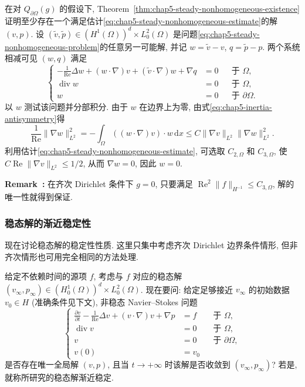\begin{Proof}
在对 $Q_{\partial\Omega}(g)$ 的假设下, Theorem~\ref{thm:chap5-steady-nonhomogeneous-existence}证明至少存在一个满足估计\eqref{eq:chap5-steady-nonhomogeneous-estimate}的解 $(v,p)$. 设 $(\widetilde v,\widetilde p)\in(H^1(\Omega))^d\times L_0^2(\Omega)$ 是问题\eqref{eq:chap5-steady-nonhomogeneous-problem}的任意另一可能解, 并记 $w=\widetilde v-v$, $q=\widetilde p-p$. 两个系统相减可见 $(w,q)$ 满足
\[
 \left\{
 \begin{aligned}
 -\frac1{\operatorname{Re}}\Delta w
 +(w\cdot\nabla)v+(\widetilde v\cdot\nabla)w+\nabla q&=0&&\text{于 }\Omega,\\
 \operatorname{div}w&=0&&\text{于 }\Omega,\\
 w&=0&&\text{于 }\partial\Omega.
 \end{aligned}
 \right.
\]
以 $w$ 测试该问题并分部积分. 由于 $w$ 在边界上为零, 由式\eqref{eq:chap5-inertia-antisymmetry}得
\[
 \frac1{\operatorname{Re}}\|\nabla w\|_{L^2}^2
 =-\int_\Omega((w\cdot\nabla)v)\cdot w\,\mathrm dx
 \leq C\|\nabla v\|_{L^2}\|\nabla w\|_{L^2}^2.
\]
利用估计\eqref{eq:chap5-steady-nonhomogeneous-estimate}, 可选取 $C_{2,\Omega}$ 和 $C_{3,\Omega}$, 使 $C\operatorname{Re}\|\nabla v\|_{L^2}\leq1/2$, 从而 $\nabla w=0$, 因此 $w=0$.
\end{Proof}

\par\noindent{}\textbf{Remark~\thechapterfivesectionthreeremark:}\label{rem:chap5-steady-homogeneous-uniqueness}
在齐次 Dirichlet 条件下 $g=0$, 只要满足 $\operatorname{Re}^2\|f\|_{H^{-1}}\leq C_{3,\Omega}$, 解的唯一性就得到保证.

\subsubsection{稳态解的渐近稳定性}
\label{subsec:chap5-steady-asymptotic-stability}

现在讨论稳态解的稳定性性质. 这里只集中考虑齐次 Dirichlet 边界条件情形, 但非齐次情形也可用完全相同的方法处理.

给定不依赖时间的源项 $f$, 考虑与 $f$ 对应的稳态解 $(v_\infty,p_\infty)\in(H_0^1(\Omega))^d\times L_0^2(\Omega)$. 现在要问: 给定足够接近 $v_\infty$ 的初始数据 $v_0\in H$ (准确条件见下文), 非稳态 Navier--Stokes 问题
\begin{equation}
\left\{
\begin{aligned}
 \frac{\partial v}{\partial t}-\frac1{\operatorname{Re}}\Delta v
 +(v\cdot\nabla)v+\nabla p&=f&&\text{于 }\Omega,\\
 \operatorname{div}v&=0&&\text{于 }\Omega,\\
 v&=0&&\text{于 }\partial\Omega,\\
 v(0)&=v_0
\end{aligned}
\right.
\label{eq:chap5-unsteady-around-steady-problem}
\end{equation}
是否存在唯一全局解 $(v,p)$, 且当 $t\to+\infty$ 时该解是否收敛到 $(v_\infty,p_\infty)$? 若是, 就称所研究的稳态解渐近稳定.

